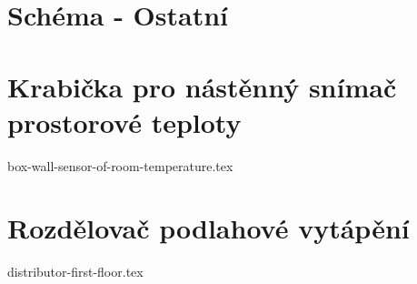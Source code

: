 \documentclass[twoside]{ctuthesis}
\theoremstyle{plain}
\theoremstyle{definition}
\theoremstyle{note}
\begin{document}
\chapter{Schéma - Ostatní}
\label{app:schemata-ostatni}














\chapter{Krabička pro nástěnný snímač prostorové teploty}
\label{app:krabicka-pro-nastenny-snimac-prostorove-teploty}

%
{box-wall-sensor-of-room-temperature.tex}

\chapter{Rozdělovač podlahové vytápění}
\label{app:rozdelovac-podlahoveho-vytapeni}
{distributor-first-floor.tex}

%
%

\end{document}
